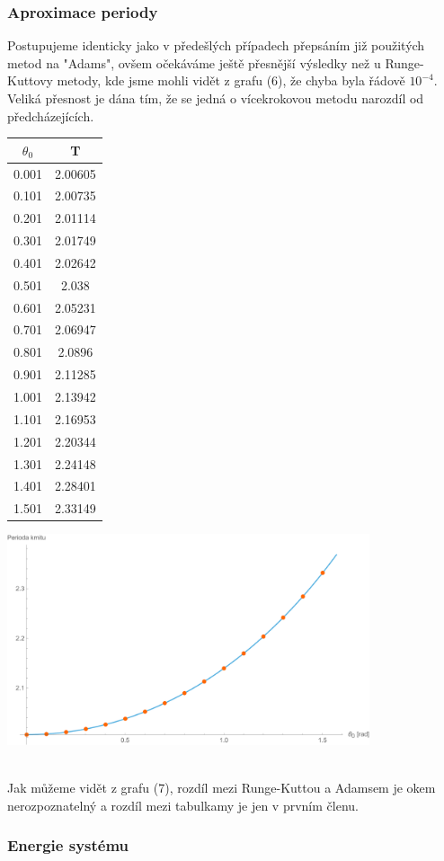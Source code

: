 \documentclass[reqno, a4paper]{amsart}
\begin{document}
			\subsubsection{Aproximace periody}
			Postupujeme identicky jako v předešlých případech přepsáním již použitých metod na "Adams", ovšem očekáváme ještě přesnější výsledky než u Runge-Kuttovy metody, kde jsme mohli vidět z grafu (6), že chyba byla řádově $10^{-4}$. Veliká přesnost je dána tím, že se jedná o vícekrokovou metodu narozdíl od předcházejících.
			\\
			\begin{minipage}{\textwidth}
				\begin{minipage}[b]{0.25\textwidth}
					\centering
					\begin{tabular}{|c|c|}
						\hline
						$\theta_{0}$ & T \\ 
						\hline
						0.001& 2.00605\\0.101& 2.00735\\0.201& 2.01114\\0.301& 2.01749\\0.401& 2.02642\\0.501& 2.038\\0.601& 2.05231\\0.701& 2.06947\\0.801& 2.0896\\0.901& 2.11285\\1.001& 2.13942
						\\1.101& 2.16953\\1.201& 2.20344\\1.301& 2.24148\\1.401& 2.28401\\1.501& 2.33149\\
						\hline
					\end{tabular}
				\end{minipage}
			\begin{minipage}[b]{0.79\textwidth}
				\centering
				\includegraphics[width=0.8\textwidth]{Runge - Kutta, Perioda}
			\end{minipage}
			\hfill
		\end{minipage}
	\\
	Jak můžeme vidět z grafu (7), rozdíl mezi Runge-Kuttou a Adamsem je okem nerozpoznatelný a rozdíl mezi tabulkamy je jen v prvním členu.
	\subsubsection{Energie systému}
	
	
	
			
\end{document}
